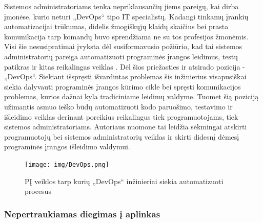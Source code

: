 \documentclass{VUMIFPSkursinis}
\begin{document}

Sistemos administratoriams tenka nepriklausančių jiems pareigų, kai dirba įmonėse, kurio neturi „DevOps“ tipo IT specialistų. Kadangi tinkamų įrankių automatizacijai trūkumas, didelis žmogiškųjų klaidų skaičius bei prasta komunikacija tarp komandų buvo sprendžiama ne su tos profesijos žmonėmis. Visi šie nesusipratimai įvyksta dėl susiformavusio požiūrio, kad tai sistemos administratorių pareiga automatizuoti programinės įrangos leidimus, testų patikras ir kitas reikalingas veiklas \cite{SaltTrecias}. Dėl šios priežasties ir atsirado pozicija - „DevOps“. Siekiant išspręsti išvardintas problemas šis inžinierius visapusiškai siekia dalyvauti programinės įrangos kūrimo cikle bei spręsti komunikacijos problemas, kurios dažnai kyla tradiciniame leidimų valdyme. Tuomet šią poziciją užimantis asmuo ieško būdų automatizuoti kodo paruošimo, testavimo ir išleidimo veiklas derinant poreikius reikalingus tiek programuotojams, tiek sistemos administratoriams. Autoriaus nuomone tai leidžia sėkmingai atskirti programuotojų bei sistemos administratorių veiklas ir skirti didesnį dėmesį programinės įrangos išleidimo valdymui.

\begin{figure}[H]
    \centering
    \texttt{[image: img/DevOps.png]}
    \caption{PĮ veiklos tarp kurių „DevOps“ inžinieriai siekia automatizuoti procesus}
    \label{img:mlp}
\end{figure}

    \subsubsection{Nepertraukiamas diegimas į aplinkas}
    
\end{document}
